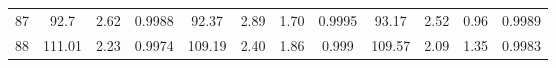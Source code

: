 \begin{table}[htbp]
{\begin{tabular}{cccccccccccc}
87                               & 92.7                          & 2.62                            & 0.9988                    & 92.37                         & 2.89                               & 1.70                    & 0.9995                    & 93.17                         & 2.52                            & 0.96                    & 0.9989                     \\
88                               & 111.01                        & 2.23                            & 0.9974                    & 109.19                        & 2.40                               & 1.86                    & 0.999                     & 109.57                        & 2.09                            & 1.35                    & 0.9983                     \\
\bottomrule
\end{tabular}
}
\end{table}



